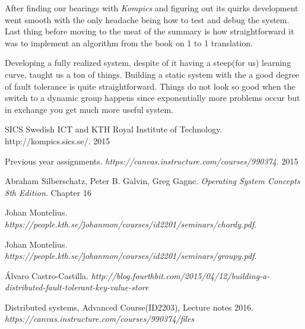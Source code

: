\documentclass[a4paper, 11pt]{article}
\begin{document}
After finding our bearings with \textit{Kompics} and figuring out its quirks development went smooth with the only headache being how to test and debug the system. Last thing before moving to the meat of the summary is how straightforward it was to implement an algorithm from the book on 1 to 1 translation. \par

Developing a fully realized system, despite of it having a steep(for us) learning curve, taught us a ton of things. Building a static system with the a good degree of fault tolerance is quite straightforward. Things do not look so good when the switch to a dynamic group happens since exponentially more problems occur but in exchange you get much more useful system. \par

\clearpage

\begin{thebibliography}{9}
	 SICS Swedish ICT and KTH Royal Institute of Technology.  http://kompics.sics.se/. 2015
	
	 Previous year assignments. \textit{https://canvas.instructure.com/courses/990374}. 2015
	
	  Abraham Silberschatz, Peter B. Galvin, Greg Gagne. \textit{Operating System Concepts 8th Edition}. Chapter 16 
	
	 Johan Montelius. \textit{https://people.kth.se/\~johanmon/courses/id2201/seminars/chordy.pdf}.
	
	 Johan Montelius. \textit{https://people.kth.se/\~johanmon/courses/id2201/seminars/groupy.pdf}.
	
	 Álvaro Castro-Castilla. \textit{	http://blog.fourthbit.com/2015/04/12/building-a-distributed-fault-tolerant-key-value-store}
	
	 Distributed systems, Advanced Course(ID2203), Lecture notes 2016. \textit{https://canvas.instructure.com/courses/990374/files}
	
\end{thebibliography}
\end{document}
